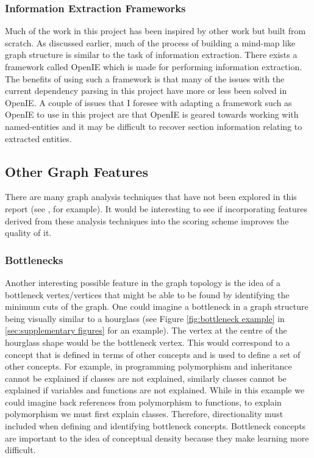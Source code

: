 \documentclass[12pt]{article}
\begin{document}
\subsubsection{Information Extraction Frameworks} Much of the work in this project has been inspired by other work but built from scratch. As discussed earlier, much of the process of building a mind-map like graph structure is similar to the task of information extraction. There exists a framework called OpenIE \citep{banko2007open} which is made for performing information extraction. The benefits of using such a framework is that many of the issues with the current dependency parsing in this project have more or less been solved in OpenIE. A couple of issues that I foresee with adapting a framework such as OpenIE to use in this project are that OpenIE is geared towards working with named-entities and it may be difficult to recover section information relating to extracted entities. 


\subsection{Other Graph Features}
There are many graph analysis techniques that have not been explored in this report (see \citep{algorithms_documentation}, for example). It would be interesting to see if incorporating features derived from these analysis techniques into the scoring scheme improves the quality of it.

\subsubsection{Bottlenecks} \label{sec:bottlenecks}
Another interesting possible feature in the graph topology is the idea of a bottleneck vertex/vertices that might be able to be found by identifying the minimum cuts of the graph. One could imagine a bottleneck in a graph structure being visually similar to a hourglass (see Figure \ref{fig:bottleneck example} in  \ref{sec:supplementary figures} for an example). The vertex at the centre of the hourglass shape would be the bottleneck vertex. This would correspond to a concept that is defined in terms of other concepts and is used to define a set of other concepts. For example, in programming polymorphism and inheritance cannot be explained if classes are not explained, similarly classes cannot be explained if variables and functions are not explained. While in this example we could imagine back references from polymorphism to functions, to explain polymorphism we must first explain classes. Therefore, directionality must included when defining and identifying bottleneck concepts. Bottleneck concepts are important to the idea of conceptual density because they make learning more difficult.
\end{document}
